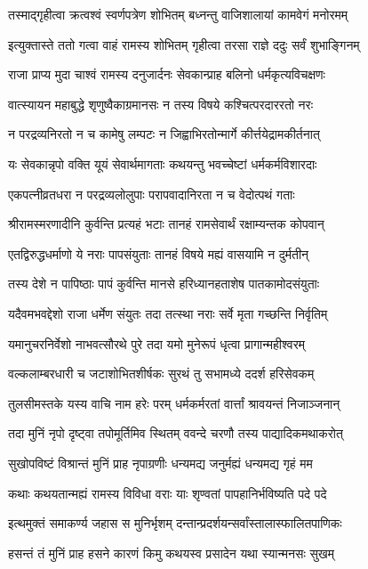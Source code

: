 \twolineshloka
{तस्माद्गृहीत्वा क्रत्वश्वं स्वर्णपत्रेण शोभितम्}
{बध्नन्तु वाजिशालायां कामवेगं मनोरमम्}%

\twolineshloka
{इत्युक्तास्ते ततो गत्वा वाहं रामस्य शोभितम्}
{गृहीत्वा तरसा राज्ञे ददुः सर्वं शुभाङ्गिनम्}%

\twolineshloka
{राजा प्राप्य मुदा चाश्वं रामस्य दनुजार्दनः}
{सेवकान्प्राह बलिनो धर्मकृत्यविचक्षणः}%

\twolineshloka
{वात्स्यायन महाबुद्धे शृणुष्वैकाग्रमानसः}
{न तस्य विषये कश्चित्परदाररतो नरः}%

\twolineshloka
{न परद्रव्यनिरतो न च कामेषु लम्पटः}
{न जिह्वाभिरतोन्मार्गे कीर्त्तयेद्रामकीर्तनात्}%

\twolineshloka
{यः सेवकान्नृपो वक्ति यूयं सेवार्थमागताः}
{कथयन्तु भवच्चेष्टां धर्मकर्मविशारदाः}%

\twolineshloka
{एकपत्नीव्रतधरा न परद्रव्यलोलुपाः}
{परापवादानिरता न च वेदोत्पथं गताः}%

\twolineshloka
{श्रीरामस्मरणादीनि कुर्वन्ति प्रत्यहं भटाः}
{तानहं रामसेवार्थं रक्षाम्यन्तक कोपवान्}%

\twolineshloka
{एतद्विरुद्धधर्माणो ये नराः पापसंयुताः}
{तानहं विषये मह्यं वासयामि न दुर्मतीन्}%

\twolineshloka
{तस्य देशे न पापिष्ठाः पापं कुर्वन्ति मानसे}
{हरिध्यानहताशेष पातकामोदसंयुताः}%

\twolineshloka
{यदैवमभवद्देशो राजा धर्मेण संयुतः}
{तदा तत्स्था नराः सर्वे मृता गच्छन्ति निर्वृतिम्}%

\twolineshloka
{यमानुचरनिर्वेशो नाभवत्सौरथे पुरे}
{तदा यमो मुनेरूपं धृत्वा प्रागान्महीश्वरम्}%

\twolineshloka
{वल्कलाम्बरधारी च जटाशोभितशीर्षकः}
{सुरथं तु सभामध्ये ददर्श हरिसेवकम्}%

\twolineshloka
{तुलसीमस्तके यस्य वाचि नाम हरेः परम्}
{धर्मकर्मरतां वार्त्तां श्रावयन्तं निजाञ्जनान्}%

\twolineshloka
{तदा मुनिं नृपो दृष्ट्वा तपोमूर्तिमिव स्थितम्}
{ववन्दे चरणौ तस्य पाद्यादिकमथाकरोत्}%

\twolineshloka
{सुखोपविष्टं विश्रान्तं मुनिं प्राह नृपाग्रणीः}
{धन्यमद्य जनुर्मह्यं धन्यमद्य गृहं मम}%

\twolineshloka
{कथाः कथयतान्मह्यं रामस्य विविधा वराः}
{याः शृण्वतां पापहानिर्भविष्यति पदे पदे}%

\twolineshloka
{इत्थमुक्तं समाकर्ण्य जहास स मुनिर्भृशम्}
{दन्तान्प्रदर्शयन्सर्वांस्तालास्फालितपाणिकः}%

\twolineshloka
{हसन्तं तं मुनिं प्राह हसने कारणं किमु}
{कथयस्व प्रसादेन यथा स्यान्मनसः सुखम्}%

